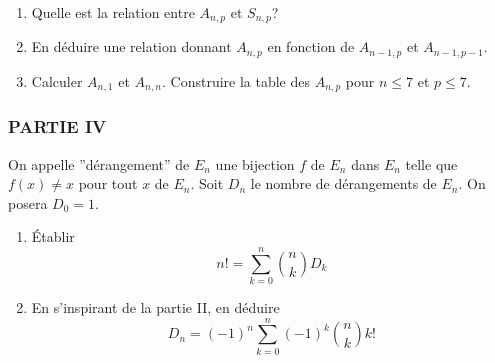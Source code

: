 \begin{enumerate}
\item  Quelle est la relation entre $A_{n,p}$ et $S_{n,p}$?

\item  En d{\'e}duire une relation donnant $A_{n,p}$ en fonction de $A_{n-1,p}$ et $A_{n-1,p-1}$.

\item  Calculer $A_{n,1}$ et $A_{n,n}$. Construire la table des $A_{n,p}$ pour $n\leq 7$ et $p\leq 7$.
\end{enumerate}

\subsubsection*{PARTIE IV}

On appelle ''d{\'e}rangement'' de $E_n$ une bijection $f$ de $E_n$ dans $E_n$ telle que $f(x)\neq x$ pour tout $x$ de $E_n$. Soit $D_n$ le nombre de d{\'e}rangements de $E_n$. On posera $D_0=1$.

\begin{enumerate}
\item \'{E}tablir
\[
n!=\sum_{k=0}^{n}\binom{n}{k}D_{k}
\]

\item  En s'inspirant de la partie II, en d{\'e}duire
\[
D_{n}=(-1)^{n}\sum_{k=0}^{n}(-1)^{k}\binom{n}{k}k!
\]
\end{enumerate}
